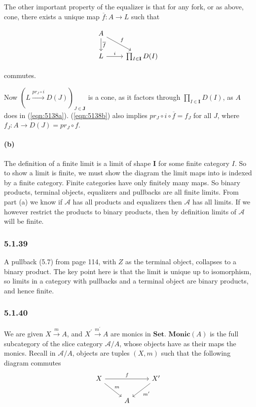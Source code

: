 \documentclass{article}
\begin{document}
The other important property of the equalizer is that for any fork, or as above, cone, there exists a unique map $\overline{f} \colon A \rightarrow L$ such that

\begin{equation}
\label{eqn:5138b}
\begin{tikzcd}
  A \arrow{d}{\overline{f}} \arrow{dr}{f} & \\
  L \arrow{r}{i} & \prod_{I \in \mathbf{I}}D(I)
\end{tikzcd}
\end{equation}

commutes.

Now $(L \xrightarrow{pr_J \circ i} D(J))_{J \in \mathbf{J}}$ is a cone, as it factors through $\prod_{I \in \mathbf{I}}D(I)$, as $A$ does in (\ref{eqn:5138a}). (\ref{eqn:5138b}) also implies $pr_J \circ i \circ \overline{f} = f_J$ for all $J$, where $f_J \colon A \rightarrow D(J) = pr_J \circ f$.

\paragraph{(b)}

The definition of a finite limit is a limit of shape $\mathbf{I}$ for some finite category $I$. So to show a limit is finite, we must show the diagram the limit maps into is indexed by a finite category. Finite categories have only finitely many maps. So binary products, terminal objects, equalizers and pullbacks are all finite limits. From part (a) we know if $\mathcal{A}$ has all products and equalizers then $\mathcal{A}$ has all limits. If we however restrict the products to binary products, then by definition limits of $\mathcal{A}$ will be finite.

\subsubsection*{5.1.39}

A pullback (5.7) from page 114, with $Z$ as the terminal object, collapses to a binary product. The key point here is that the limit is unique up to isomorphism, so limits in a category with pullbacks and a terminal object are binary products, and hence finite.

\subsubsection*{5.1.40}

We are given $X \xrightarrow{m} A$, and $X^\prime \xrightarrow{m^\prime} A$ are monics in $\mathbf{Set}$. $\mathbf{Monic}(A)$ is the full subcategory of the slice category $\mathcal{A} / A$, whose objects have as their maps the monics. Recall in $\mathcal {A}/A$, objects are tuples $(X, m)$ such that the following diagram commutes
\begin{equation*}
\begin{tikzcd}
X \arrow{dr}{m} \arrow{rr}{f}
& & X^\prime \arrow{dl}{m^\prime} \\
& A
\end{tikzcd}
\end{equation*}
\end{document}

